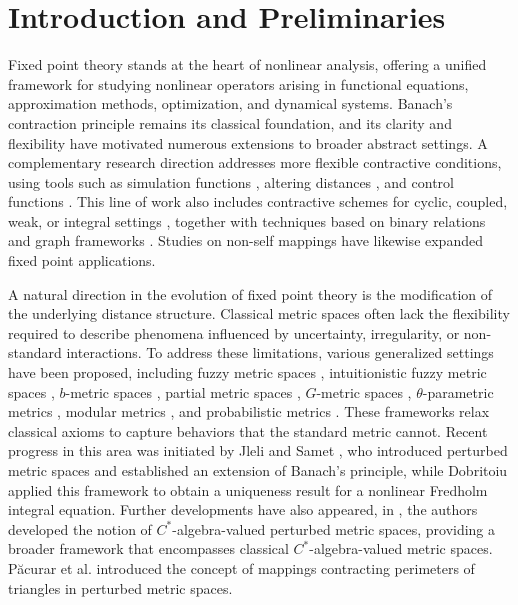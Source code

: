 \documentclass[sn-mathphys-num]{sn-jnl}%
\theoremstyle{thmstyleone}%
\theoremstyle{thmstyletwo}%
\theoremstyle{thmstylethree}%
\numberwithin{equation}{section}
\begin{document}



\maketitle
\section{Introduction and Preliminaries}
Fixed point theory stands at the heart of nonlinear analysis, offering a unified framework for studying nonlinear operators arising in functional equations, approximation methods, optimization, and dynamical systems. Banach’s contraction principle remains its classical foundation, and its clarity and flexibility have motivated numerous extensions to broader abstract settings. A complementary research direction addresses more flexible contractive conditions, using tools such as simulation functions \cite{khoja,simulation2,ext,control}, altering distances \cite{altering}, and control functions \cite{function1,function2}. This line of work also includes contractive schemes for cyclic, coupled, weak, or integral settings \cite{cyclic1,cyclic2,coupled}, together with techniques based on binary relations and graph frameworks \cite{relation1,relation2,relation3,relation4,relation5}. Studies on non-self mappings \cite{best1} have likewise expanded fixed point applications.

A natural direction in the evolution of fixed point theory is the modification of the underlying distance structure. Classical metric spaces often lack the flexibility required to describe phenomena influenced by uncertainty, irregularity, or non-standard interactions. To address these limitations, various generalized settings have been proposed, including fuzzy metric spaces \cite{kramosil,gv,surveyfuzzy}, intuitionistic fuzzy metric spaces \cite{intuimetric}, $b$-metric spaces \cite{bmetric1,bmetric2}, partial metric spaces \cite{partialmetric}, $G$-metric spaces \cite{Gmetric}, $\theta$-parametric metrics \cite{meparametric}, modular metrics \cite{modularmetric}, and probabilistic metrics \cite{probametric}. These frameworks relax classical axioms to capture behaviors that the standard metric cannot. 
Recent progress in this area was initiated by Jleli and Samet \cite{jleli}, who introduced perturbed metric spaces and established an extension of Banach’s principle, while Dobritoiu \cite{Dobri} applied this framework to obtain a uniqueness result for a nonlinear Fredholm integral equation. Further developments have also appeared, in \cite{Tijani}, the authors developed the notion of $C^{*}$-algebra-valued perturbed metric spaces, providing a broader framework that encompasses classical $C^{*}$-algebra-valued metric spaces. Păcurar et al. \cite{Pacurar} introduced the concept of mappings contracting perimeters of triangles in perturbed metric spaces.
 
\end{document}
